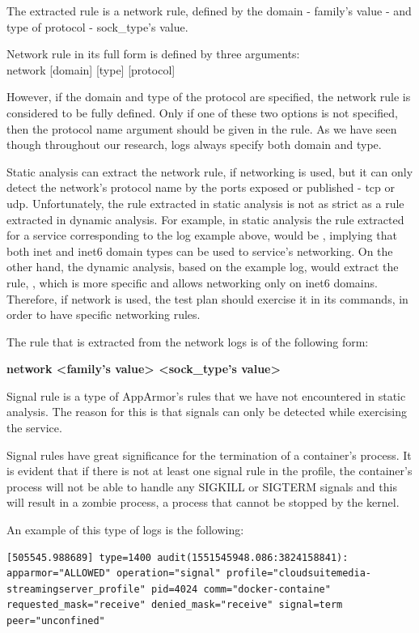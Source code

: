 \begin{description}[style=nextline]
The extracted rule is a network rule, defined by the domain - family's value - and type of protocol - sock\_type's value.

Network rule in its full form is defined by three arguments:\\network [domain] [type] [protocol]

However, if the domain and type of the protocol are specified, the network rule is considered to be fully defined. Only if one of these two options is not specified, then the protocol name argument should be given in the rule. As we have seen though throughout our research, logs always specify both domain and type.

Static analysis can extract the network rule, if networking is used, but it can only detect the network's protocol name by the ports exposed or published - tcp or udp. Unfortunately, the rule extracted in static analysis is not as strict as a rule extracted in dynamic analysis. For example, in static analysis the rule extracted for a service corresponding to the log example above, would be , implying that both inet and inet6 domain types can be used to service's networking. On the other hand, the dynamic analysis, based on the example log, would extract the rule, , which is more specific and allows networking only on inet6 domains. Therefore, if network is used, the test plan should exercise it in its commands, in order to have specific networking rules.

The rule that is extracted from the network logs is of the following form:

\textbf{network \textless family's value\textgreater{} \textless sock\_type's value\textgreater}

\item[Signal]
Signal rule is a type of AppArmor's rules that we have not encountered in static analysis. The reason for this is that signals can only be detected while exercising the service. 

Signal rules have great significance for the termination of a container's process. It is evident that if there is not at least one signal rule in the profile, the container's process will not be able to handle any SIGKILL or SIGTERM signals and this will result in a zombie process, a process that cannot be stopped by the kernel. 
 
An example of this type of logs is the following:

\begin{lstlisting}[style=dockercommands]
[505545.988689] type=1400 audit(1551545948.086:3824158841): apparmor="ALLOWED" operation="signal" profile="cloudsuitemedia-streamingserver_profile" pid=4024 comm="docker-containe" requested_mask="receive" denied_mask="receive" signal=term peer="unconfined"
\end{lstlisting}


\end{description}
